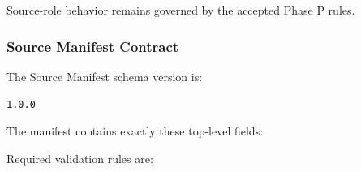 Source-role behavior remains governed by the accepted Phase P rules.

\hypertarget{source-manifest-contract}{%
\subsubsection{Source Manifest Contract}\label{source-manifest-contract}}

The Source Manifest schema version is:

\texttt{1.0.0}

The manifest contains exactly these top-level fields:

\begin{Shaded}
\begin{Highlighting}[]
\FunctionTok{\{}
  \FunctionTok{:} \FunctionTok{,}
  \FunctionTok{:} \FunctionTok{,}
  \FunctionTok{:} \FunctionTok{,}
  \FunctionTok{:} \FunctionTok{,}
  \FunctionTok{:} \FunctionTok{,}
  \FunctionTok{:} \FunctionTok{,}
  \FunctionTok{:} \FunctionTok{,}
  \FunctionTok{:} \FunctionTok{,}
  \FunctionTok{:} \FunctionTok{,}
  \FunctionTok{:} \FunctionTok{,}
  \FunctionTok{:} 
\FunctionTok{\}}
\end{Highlighting}
\end{Shaded}

Required validation rules are:

